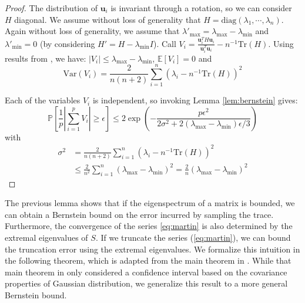 \begin{proof}
The distribution of $\mathbf{u}_{i}$ is invariant through a rotation,
so we can consider $H$ diagonal. We assume without loss of generality
that $H=\text{diag}\left(\lambda_{1},\cdots,\lambda_{n}\right)$.
Again without loss of generality, we assume that $\lambda'_{\max}=\lambda_{\max}-\lambda_{\min}$
and $\lambda'_{\min}=0$ (by considering $H'=H-\lambda_{\min}I$).
Call $V_{i}=\frac{\mathbf{u}_{i}^{T}H\mathbf{u}_{i}}{\mathbf{u}_{i}^{T}\mathbf{u}_{i}}-n^{-1}\text{Tr}\left(H\right)$.
Using results from \cite{Barry1999}, we have: $\left|V_{i}\right|\leq\lambda_{\max}-\lambda_{\min}$,
$\mathbb{E}\left[V_{i}\right]=0$ and 
\[
\text{Var}\left(V_{i}\right)=\frac{2}{n(n+2)}\sum_{i=1}^{n}\left(\lambda_{i}-n^{-1}\text{Tr}\left(H\right)\right)^{2}
\]


Each of the variables $V_{i}$ is independent, %
so invoking Lemma \ref{lem:bernstein} gives: 
\[
\mathbb{P}\left[\frac{1}{p}\left|\sum_{i=1}^{p}V_{i}\right|\geq\epsilon\right]\leq2\exp\left(-\frac{p\epsilon^{2}}{2\sigma^{2}+2\left(\lambda_{\max}-\lambda_{\min}\right)\epsilon/3}\right)
\]
with 
\begin{align*}
\sigma^{2} & =\frac{2}{n(n+2)}\sum_{i=1}^{n}\left(\lambda_{i}-n^{-1}\text{Tr}\left(H\right)\right)^{2}\\
 & \leq\frac{2}{n^{2}}\sum_{i=1}^{n}\left(\lambda_{\max}-\lambda_{\min}\right)^{2}=\frac{2}{n}\left(\lambda_{\max}-\lambda_{\min}\right)^{2}
\end{align*}

\end{proof}
The previous lemma shows that if the eigenspectrum of a matrix is
bounded, we can obtain a Bernstein bound on the error incurred by
sampling the trace. Furthermore, the convergence of the series \eqref{eq:martin}
is also determined by the extremal eigenvalues of $S$. If we truncate
the series (\ref{eq:martin}), we can bound the truncation error using
the extremal eigenvalues. We formalize this intuition in the following
theorem, which is adapted from the main theorem in \cite{Barry1999}.
While that main theorem in \cite{Barry1999} only considered a confidence
interval based on the covariance properties of Gaussian distribution,
we generalize this result to a more general Bernstein bound.
